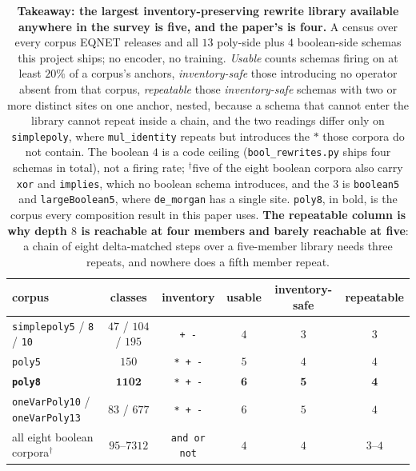\begin{table}[t]
\caption{\textbf{Takeaway: the largest inventory-preserving rewrite library available anywhere in the survey is five, and the paper's is four.} A census over every corpus EQNET releases and all $13$ poly-side plus $4$ boolean-side schemas this project ships; no encoder, no training. \emph{Usable} counts schemas firing on at least $20\%$ of a corpus's anchors, \emph{inventory-safe} those introducing no operator absent from that corpus, \emph{repeatable} those \emph{inventory-safe} schemas with two or more distinct sites on one anchor, nested, because a schema that cannot enter the library cannot repeat inside a chain, and the two readings differ only on \texttt{simplepoly}, where \texttt{mul\_identity} repeats but introduces the $*$ those corpora do not contain. The boolean $4$ is a code ceiling (\texttt{bool\_rewrites.py} ships four schemas in total), not a firing rate; $^{\dagger}$five of the eight boolean corpora also carry \texttt{xor} and \texttt{implies}, which no boolean schema introduces, and the $3$ is \texttt{boolean5} and \texttt{largeBoolean5}, where \texttt{de\_morgan} has a single site. \texttt{poly8}, in bold, is the corpus every composition result in this paper uses. \textbf{The repeatable column is why depth $8$ is reachable at four members and barely reachable at five}: a chain of eight delta-matched steps over a five-member library needs three repeats, and nowhere does a fifth member repeat.}
\label{tab:library_ceiling}
\small\setlength{\tabcolsep}{4pt}%
\begin{tabular}{@{}l c c c c c@{}}
\toprule
corpus & classes & inventory & usable & inventory-safe & repeatable \\
\midrule
\texttt{simplepoly5} / \texttt{8} / \texttt{10} & $47$ / $104$ / $195$ & \texttt{+ -} & $4$ & $3$ & $3$ \\
\texttt{poly5} & $150$ & \texttt{* + -} & $5$ & $4$ & $4$ \\
\textbf{\texttt{poly8}} & $\mathbf{1102}$ & \texttt{* + -} & $\mathbf{6}$ & $\mathbf{5}$ & $\mathbf{4}$ \\
\texttt{oneVarPoly10} / \texttt{oneVarPoly13} & $83$ / $677$ & \texttt{* + -} & $6$ & $5$ & $4$ \\
\midrule
all eight boolean corpora$^{\dagger}$ & $95$--$7312$ & \texttt{and or not} & $4$ & $4$ & $3$--$4$ \\
\bottomrule
\end{tabular}
\end{table}

